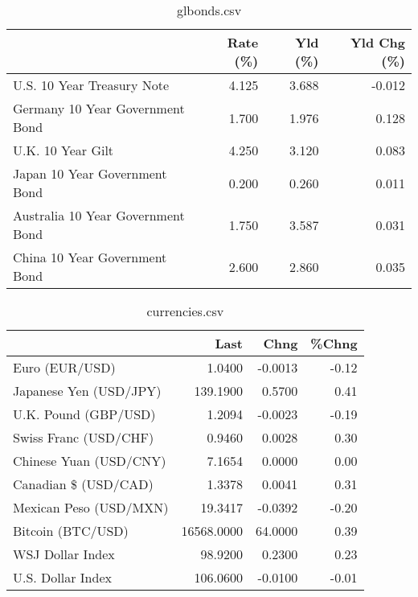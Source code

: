 \documentclass{article}%
\begin{document}
%


\begin{table}[htbp]%
\caption{glbonds.csv}%
\centering%
\begin{adjustbox}{width=1\textwidth}%
\begin{tabular}{lrrr}
\toprule
                                  &  Rate (\%) &  Yld (\%) &  Yld Chg (\%) \\
\midrule
       U.S. 10 Year Treasury Note &     4.125 &    3.688 &       -0.012 \\
  Germany 10 Year Government Bond &     1.700 &    1.976 &        0.128 \\
                U.K. 10 Year Gilt &     4.250 &    3.120 &        0.083 \\
    Japan 10 Year Government Bond &     0.200 &    0.260 &        0.011 \\
Australia 10 Year Government Bond &     1.750 &    3.587 &        0.031 \\
    China 10 Year Government Bond &     2.600 &    2.860 &        0.035 \\
\bottomrule
\end{tabular}
%
\end{adjustbox}%
\end{table}

%


\begin{table}[htbp]%
\caption{currencies.csv}%
\centering%
\begin{adjustbox}{width=1\textwidth}%
\begin{tabular}{lrrr}
\toprule
                       &       Last &    Chng &  \%Chng \\
\midrule
        Euro (EUR/USD) &     1.0400 & -0.0013 &  -0.12 \\
Japanese Yen (USD/JPY) &   139.1900 &  0.5700 &   0.41 \\
  U.K. Pound (GBP/USD) &     1.2094 & -0.0023 &  -0.19 \\
 Swiss Franc (USD/CHF) &     0.9460 &  0.0028 &   0.30 \\
Chinese Yuan (USD/CNY) &     7.1654 &  0.0000 &   0.00 \\
  Canadian \$ (USD/CAD) &     1.3378 &  0.0041 &   0.31 \\
Mexican Peso (USD/MXN) &    19.3417 & -0.0392 &  -0.20 \\
     Bitcoin (BTC/USD) & 16568.0000 & 64.0000 &   0.39 \\
      WSJ Dollar Index &    98.9200 &  0.2300 &   0.23 \\
     U.S. Dollar Index &   106.0600 & -0.0100 &  -0.01 \\
\bottomrule
\end{tabular}
%
\end{adjustbox}%
\end{table}

%
\end{document}
